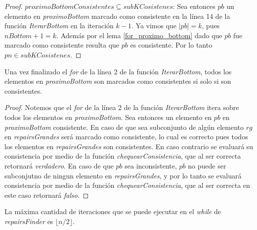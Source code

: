 \documentclass[11pt,a4paper,twoside]{tesis}
\newcommand{\parteEntera}{\lfloor n/2 \rfloor}
\begin{document}
\begin{proof}
\underline{$proximoBottomConsistentes \subseteq subKCosistenes$}: Sea entonces $pb$ un elemento en \textit{proximoBottom} marcado como consistente en la línea 14 de la función \textit{IterarBottom} en la iteración $k-1$. Ya vimos que $|pb| = k$, pues $nBottom + 1 = k$. Además por el lema \ref{for_proximo_bottom} dado que $pb$ fue marcado como consistente resulta que $pb$ es consistente. Por lo tanto $pn \in subKCosistenes$. 

\end{proof}


\begin{lemma}\label{for_proximo_bottom}
Una vez finalizado el \textit{for} de la línea 2 de la función \textit{IterarBottom}, todos los elementos en \textit{proximoBottom} son marcados como consistentes si solo si son consistentes.
\end{lemma}

\begin{proof}
Notemos que el \textit{for} de la línea 2 de la función \textit{IterarBottom} itera sobre todos los elementos en \textit{proximoBottom}. Sea entonces un elemento en $pb$ en \textit{proximoBottom} consistente. En caso de que sea subconjunto de algún elemento $rg$ en \textit{repairsGrandes} será marcado como consistente, lo cual es correcto pues todos los elementos en \textit{repairsGrandes} son consistentes.  En caso contrario se evaluará su consistencia por medio de la función \textit{chequearConsistencia}, que al ser correcta retornará \textit{verdadero}. En caso de que $pb$ sea inconsistente, $pb$ no puede ser subconjutno de ningun elemento en \textit{repairsGrandes}, y por lo tanto se evaluará consistencia por medio de la función \textit{chequearConsistencia}, que al ser correcta en este caso retornará \textit{falso}.  
\end{proof}

\begin{lemma}\label{maxima_cantidad_de_iteraciones}
La máxima cantidad de iteraciones que se puede ejecutar en el \textit{while} de \textit{repairsFinder} es $\parteEntera$.
\end{lemma}
\end{document}
